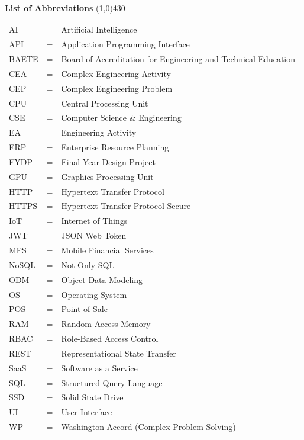 
\setlength{\headheight}{14pt}
\begin{center}
	{\huge \bf List of Abbreviations}
	\line(1,0){430}
\end{center}

\renewcommand{\arraystretch}{1.3} %

\begin{tabular}{@{} l @{\hspace{1.0cm}} c @{\hspace{1.0cm}} l @{}}
AI     & = & Artificial Intelligence \\
API    & = & Application Programming Interface \\
BAETE  & = & Board of Accreditation for Engineering and Technical Education \\
CEA    & = & Complex Engineering Activity \\
CEP    & = & Complex Engineering Problem \\
CPU    & = & Central Processing Unit \\
CSE    & = & Computer Science \& Engineering \\
EA     & = & Engineering Activity \\
ERP    & = & Enterprise Resource Planning \\
FYDP   & = & Final Year Design Project \\
GPU    & = & Graphics Processing Unit \\
HTTP   & = & Hypertext Transfer Protocol \\
HTTPS  & = & Hypertext Transfer Protocol Secure \\
IoT    & = & Internet of Things \\
JWT    & = & JSON Web Token \\
MFS    & = & Mobile Financial Services \\
NoSQL  & = & Not Only SQL \\
ODM    & = & Object Data Modeling \\
OS     & = & Operating System \\
POS    & = & Point of Sale \\
RAM    & = & Random Access Memory \\
RBAC   & = & Role-Based Access Control \\
REST   & = & Representational State Transfer \\
SaaS   & = & Software as a Service \\
SQL    & = & Structured Query Language \\
SSD    & = & Solid State Drive \\
UI     & = & User Interface \\
WP     & = & Washington Accord (Complex Problem Solving) \\
\end{tabular}